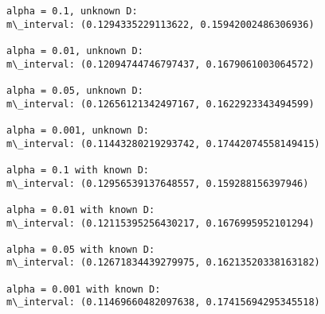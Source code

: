 \documentclass[11pt]{article}
\begin{document}
    \begin{Verbatim}[commandchars=\\\{\}]
alpha = 0.1, unknown D:
m\_interval: (0.1294335229113622, 0.15942002486306936)

alpha = 0.01, unknown D:
m\_interval: (0.12094744746797437, 0.1679061003064572)

alpha = 0.05, unknown D:
m\_interval: (0.12656121342497167, 0.1622923343494599)

alpha = 0.001, unknown D:
m\_interval: (0.11443280219293742, 0.17442074558149415)

alpha = 0.1 with known D:
m\_interval: (0.12956539137648557, 0.159288156397946)

alpha = 0.01 with known D:
m\_interval: (0.12115395256430217, 0.1676995952101294)

alpha = 0.05 with known D:
m\_interval: (0.12671834439279975, 0.16213520338163182)

alpha = 0.001 with known D:
m\_interval: (0.11469660482097638, 0.17415694295345518)


    \end{Verbatim}

    \begin{center}
    \end{center}
    { \hspace*{\fill} \\}
    
\end{document}
